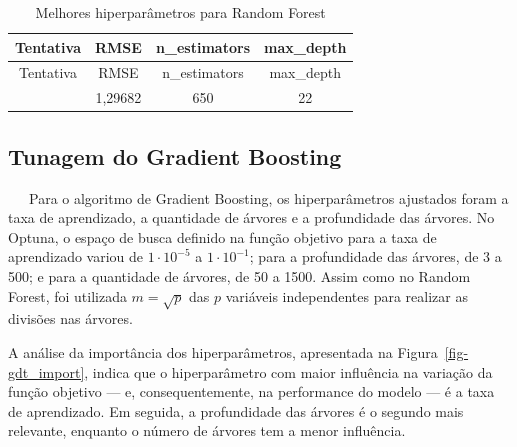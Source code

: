 \documentclass[
  12pt,
  a4paper,
]{scrreprt}
\begin{document}
\begin{longtable}[]{@{}cccc@{}}
\caption{Melhores hiperparâmetros para Random
Forest}\label{tbl-params_rf}\tabularnewline
\toprule\noalign{}
Tentativa & RMSE & n\_estimators & max\_depth \\
\midrule\noalign{}
\endfirsthead
\toprule\noalign{}
Tentativa & RMSE & n\_estimators & max\_depth \\
\midrule\noalign{}
\endhead
\bottomrule\noalign{}
\endlastfoot
67 & 1,29682 & 650 & 22 \\
\end{longtable}

\subsection{Tunagem do Gradient
Boosting}\label{tunagem-do-gradient-boosting}

~~~Para o algoritmo de Gradient Boosting, os hiperparâmetros ajustados
foram a taxa de aprendizado, a quantidade de árvores e a profundidade
das árvores. No Optuna, o espaço de busca definido na função objetivo
para a taxa de aprendizado variou de \(1 \cdot 10^{-5}\) a
\(1 \cdot 10^{-1}\); para a profundidade das árvores, de 3 a 500; e para
a quantidade de árvores, de 50 a 1500. Assim como no Random Forest, foi
utilizada \(m = \sqrt{p}\)\hspace{0pt} das \(p\) variáveis independentes
para realizar as divisões nas árvores.

\vspace{12pt}

A análise da importância dos hiperparâmetros, apresentada na
Figura~\ref{fig-gdt_import}, indica que o hiperparâmetro com maior
influência na variação da função objetivo --- e, consequentemente, na
performance do modelo --- é a taxa de aprendizado. Em seguida, a
profundidade das árvores é o segundo mais relevante, enquanto o número
de árvores tem a menor influência.
\end{document}
